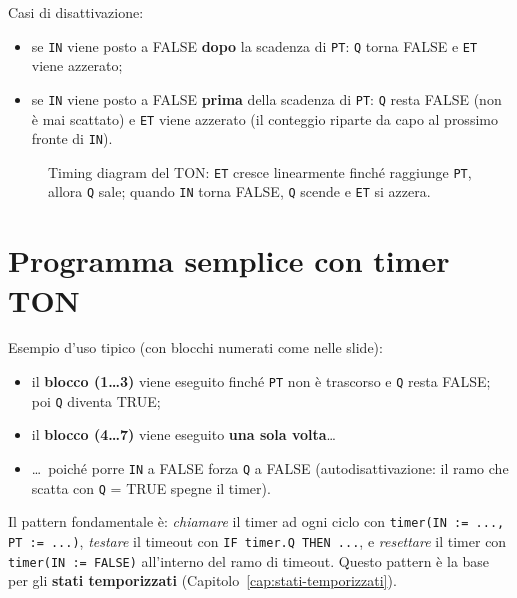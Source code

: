 Casi di disattivazione:
\begin{itemize}
    \item se \texttt{IN} viene posto a FALSE \textbf{dopo} la scadenza di \texttt{PT}: \texttt{Q} torna FALSE e \texttt{ET} viene azzerato;
    \item se \texttt{IN} viene posto a FALSE \textbf{prima} della scadenza di \texttt{PT}: \texttt{Q} resta FALSE (non è mai scattato) e \texttt{ET} viene azzerato (il conteggio riparte da capo al prossimo fronte di \texttt{IN}).
\end{itemize}

\begin{figure}[htbp]
\centering
{}
\caption{Timing diagram del TON: \texttt{ET} cresce linearmente finché raggiunge \texttt{PT}, allora \texttt{Q} sale; quando \texttt{IN} torna FALSE, \texttt{Q} scende e \texttt{ET} si azzera.}
\label{fig:ton-timing}
\end{figure}

\section{Programma semplice con timer TON}
Esempio d'uso tipico (con blocchi numerati come nelle slide):
\begin{itemize}
    \item il \textbf{blocco (1\ldots3)} viene eseguito finché \texttt{PT} non è trascorso e \texttt{Q} resta FALSE; poi \texttt{Q} diventa TRUE;
    \item il \textbf{blocco (4\ldots7)} viene eseguito \textbf{una sola volta}\ldots
    \item \ldots\ poiché porre \texttt{IN} a FALSE forza \texttt{Q} a FALSE (autodisattivazione: il ramo che scatta con \texttt{Q} = TRUE spegne il timer).
\end{itemize}

\begin{intuition}
Il pattern fondamentale è: \emph{chiamare} il timer ad ogni ciclo con \texttt{timer(IN := ..., PT := ...)}, \emph{testare} il timeout con \texttt{IF timer.Q THEN ...}, e \emph{resettare} il timer con \texttt{timer(IN := FALSE)} all'interno del ramo di timeout. Questo pattern è la base per gli \textbf{stati temporizzati} (Capitolo~\ref{cap:stati-temporizzati}).
\end{intuition}
